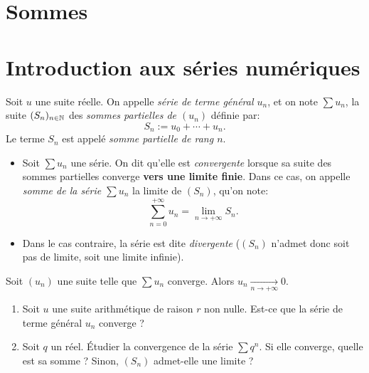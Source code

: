 \documentclass[../main.tex]{subfiles}
\begin{document}


\section{Sommes}

\section{Introduction aux séries numériques}

\begin{mydef}[Série]
	Soit $u$ une suite réelle. On appelle \textit{série de terme général $u_n$}, et on note $\sum u_n$, la suite $(S_n)_{n\in\mathbb N}$ des \textit{sommes partielles de $(u_n)$} définie par:
	\[
	S_n := u_0 + \cdots + u_n.
	\]
	Le terme $S_n$ est appelé \textit{somme partielle de rang $n$}.
\end{mydef}

\begin{mydef}\leavevmode
	\begin{itemize}
		\item Soit $\sum u_n$ une série. On dit qu'elle est \textit{convergente} lorsque sa suite des sommes partielles converge \textbf{vers une limite finie}. Dans ce cas, on appelle \textit{somme de la série $\sum u_n$} la limite de $(S_n)$, qu'on note:
		\[
		\sum_{n=0}^{+\infty} u_n = \lim_{n\to +\infty} S_n.
		\]
		\item Dans le cas contraire, la série est dite \textit{divergente} ($(S_n)$ n'admet donc soit pas de limite, soit une limite infinie).
	\end{itemize}
\end{mydef}

\begin{prop}
	Soit $(u_n)$ une suite telle que $\sum u_n$ converge. Alors $u_n\xrightarrow[n\to+\infty]{}0$.
\end{prop}

\begin{exo}[M]
	\begin{enumerate}
		\item Soit $u$ une suite arithmétique de raison $r$ non nulle. Est-ce que la série de terme général $u_n$ converge ?
		\item Soit $q$ un réel. Étudier la convergence de la série $\sum q^n$. Si elle converge, quelle est sa somme ? Sinon, $(S_n)$ admet-elle une limite ?
	\end{enumerate}
\end{exo}
\end{document}
